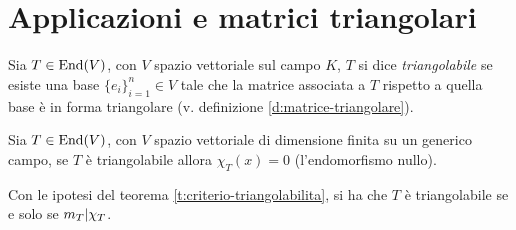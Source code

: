 \section{Applicazioni e matrici triangolari}
\begin{definizione} \label{d:endomorfismo-triangolabile}
	Sia $T\in \operatorname{End}(V)$, con $V$ spazio vettoriale sul campo $K$, $T$ si dice \emph{triangolabile} se esiste una base $\{e_i\}_{i=1}^n\in V$ tale che la matrice associata a $T$ rispetto a quella base è in forma triangolare (v. definizione \ref{d:matrice-triangolare}).
\end{definizione}
\begin{teorema} \label{t:criterio-triangolabilita}
	Sia $T\in \operatorname{End}(V)$, con $V$ spazio vettoriale di dimensione finita su un generico campo, se $T$ è triangolabile allora $\chi_T(x) = 0$ (l'endomorfismo nullo).
\end{teorema}
\begin{corollario}
	Con le ipotesi del teorema \ref{t:criterio-triangolabilita}, si ha che $T$ è triangolabile se e solo se $m_T|\chi_T$.
\end{corollario}
